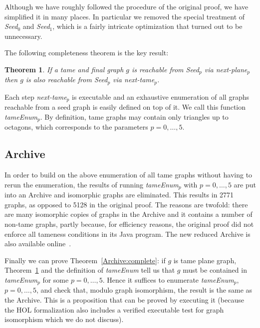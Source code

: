 \documentclass[11pt]{amsart}
\newtheorem{thm}{Theorem}
\begin{document}
Although we have roughly followed the procedure of the original proof, we have simplified it in
many places. In particular we removed the special treatment of
\textit{Seed$_0$} and \textit{Seed$_1$}, which is a fairly intricate
optimization that turned out to be unnecessary.

The following completeness theorem is the key result:
\begin{thm}\label{thm:TameEnum_comp}
If a tame and final graph $g$ is reachable from
\textit{Seed$_p$} via \textit{next-plane$_p$}
then $g$ is also reachable from \textit{Seed$_p$} via \textit{next-tame$_p$}.
\end{thm}

Each step \textit{next-tame$_p$} is executable and an exhaustive enumeration
of all graphs reachable from a seed graph is easily defined on top of it. We
call this function \textit{tameEnum$_p$}. By definition, tame graphs may
contain only triangles up to octagons, which corresponds to the parameters $p
= 0,\dots,5$.

\subsection*{Archive}

In order to build on the above enumeration of all tame graphs without having
to rerun the enumeration, the results of running \textit{tameEnum$_p$} with
$p = 0,\dots,5$ are put into an Archive and isomorphic graphs are
eliminated. This results in 2771 graphs, as opposed to 5128 in the original proof. The
reasons are twofold: there are many isomorphic copies of graphs in the
Archive and it contains a number of non-tame graphs, partly because, for
efficiency reasons, the original proof did not enforce all tameness conditions in its Java
program. The new reduced Archive is also available
online~\cite{BauerN-AFP06}.

Finally we can prove Theorem~\ref{Archive:complete}: if $g$ is tame plane
graph, Theorem~\ref{thm:TameEnum_comp} and the definition of
\textit{tameEnum} tell us that $g$ must be contained in \textit{tameEnum$_p$}
for some $p=0,\dots,5$. Hence it suffices to enumerate \textit{tameEnum$_p$},
$p=0,\dots,5$, and check that, modulo graph isomorphism, the result is the
same as the Archive. This is a proposition that can be proved by executing it
(because the HOL formalization also includes a verified executable test for
graph isomorphism which we do not discuss).
\end{document}
